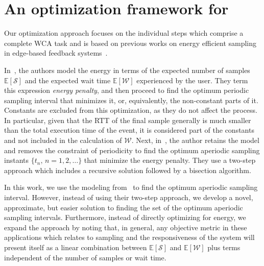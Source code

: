 \section{An optimization framework for }


Our optimization approach focuses on the individual steps which comprise a complete \gls{WCA} task and is based on previous works on energy efficient sampling in edge-based feedback systems~\cite{moothedath2021energy,moothedath2022energy1,moothedath2022energy2}.

In~\cite{moothedath2021energy,moothedath2022energy1}, the authors model the energy in terms of the expected number of samples $\mathbb{E}[\mathcal{S}]$ and the expected wait time $\mathbb{E}[\mathcal{W}]$ experienced by the user.
They term this expression \emph{energy penalty}, and then proceed to find the optimum periodic sampling interval that minimizes it, or, equivalently, the non-constant parts of it.
Constants are excluded from this optimization, as they do not affect the process.
In particular, given that the \gls{RTT} of the final sample generally is much smaller than the total execution time of the event, it is considered part of the constants and not included in the calculation of $\mathcal{W}$.
Next, in~\cite{moothedath2022energy2}, the author retains the model and removes the constraint of periodicity to find the optimum aperiodic sampling instants $\{t_n,\,n=1,2,\dots\}$ that minimize the energy penalty.
They use a two-step approach which includes a recursive solution followed by a bisection algorithm.

In this work, we use the modeling from~\cite{moothedath2022energy2} to find the optimum aperiodic sampling interval.
However, instead of using their two-step approach, we develop a novel, approximate, but easier solution to finding the set of the optimum aperiodic sampling intervals.
Furthermore, instead of directly optimizing for energy, we expand the approach by noting that, in general, any objective metric in these applications which relates to sampling and the responsiveness of the system will present itself as a linear combination between $\mathbb{E}[\mathcal{S}]$ and $\mathbb{E}[\mathcal{W}]$ plus terms independent of the number of samples or wait time.

